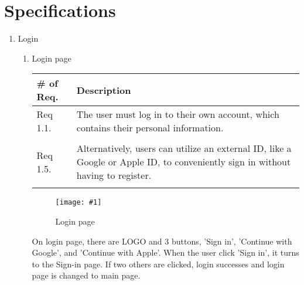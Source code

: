 \newpage
\section{\Large{Specifications}}
\begin{enumerate}[label=\arabic*.]

    \newcommand{\addImage}[2]{
        \begin{figure}[!htb]
            \begin{center}
                \texttt{[image: \#1]}
                \caption{#2} %
                \renewcommand{\thefigure}{\thesubsection.\arabic{figure}}
            \end{center}
        \end{figure}
    }

    \newcommand{\requirementTable}[1]{
        \begin{table}[H]
            \center
            \begin{tabular}{m{1.4cm} m{5.5cm}}
                \toprule
                \# of Req. & Description \\
                \midrule
                #1
                \bottomrule
            \end{tabular}
        \end{table}
    }

    \item {\large{Login}}\\
          \begin{enumerate}[label*={\arabic*.},ref=\theenumi.\arabic*]
              \setlength{\itemindent}{0.5cm}
              \item Login page
                    \requirementTable{
                        Req 1.1. & The user must log in to their own account, which contains their personal information.\\\\
                        Req 1.5. & Alternatively, users can utilize an external ID, like a Google or Apple ID, to conveniently sign in without having to register.\\\\
                    }
                    \addImage{
                        imgs/specification/firstPage.png
                    }{
                        Login page
                    }
                    On login page, there are LOGO and 3 buttons, 'Sign in', 'Continue with Google', and 'Continue with Apple'. When the user click 'Sign in', it turns to the Sign-in page. If two others are clicked, login successes and login page is changed to main page.\\\\
                    \newpage


\end{enumerate}
\end{enumerate}

